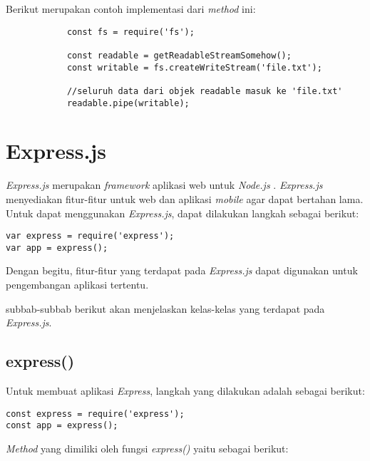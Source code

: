 \begin{enumerate}
\begin{itemize}
\begin{itemize}
			Berikut merupakan contoh implementasi dari \textit{method} ini:
			\begin{lstlisting}
			const fs = require('fs');
			
			const readable = getReadableStreamSomehow();
			const writable = fs.createWriteStream('file.txt');
			
			//seluruh data dari objek readable masuk ke 'file.txt'
			readable.pipe(writable); 
			\end{lstlisting}
			
		\end{itemize}
	\end{itemize}
\end{enumerate}



\section{Express.js}
\label{sec:Express.js}

\textit{Express.js} merupakan \textit{framework} aplikasi web untuk \textit{Node.js} \cite{expressjs}. \textit{Express.js} menyediakan fitur-fitur untuk web dan aplikasi \textit{mobile} agar dapat bertahan lama. Untuk dapat menggunakan \textit{Express.js}, dapat dilakukan langkah sebagai berikut: 
\begin{lstlisting}
var express = require('express');
var app = express();
\end{lstlisting}

Dengan begitu, fitur-fitur yang terdapat pada \textit{Express.js} dapat digunakan untuk pengembangan aplikasi tertentu.

subbab-subbab berikut akan menjelaskan kelas-kelas yang terdapat pada \textit{Express.js}.

\subsection{express()}
Untuk membuat aplikasi \textit{Express}, langkah yang dilakukan adalah sebagai berikut:
\begin{lstlisting}
const express = require('express');
const app = express();
\end{lstlisting}

\textit{Method} yang dimiliki oleh fungsi \textit{express()} yaitu sebagai berikut:

